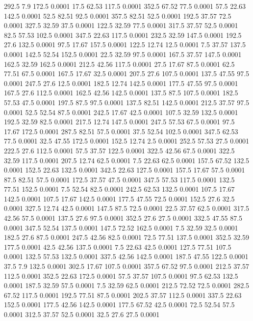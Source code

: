 292.5	7.9	172.5	0.0001
17.5	62.53	117.5	0.0001
352.5	67.52	77.5	0.0001
57.5	22.63	142.5	0.0001
52.5	82.51	92.5	0.0001
357.5	82.51	52.5	0.0001
192.5	37.57	72.5	0.0001
327.5	32.59	37.5	0.0001
122.5	32.59	77.5	0.0001
317.5	37.57	52.5	0.0001
82.5	57.53	102.5	0.0001
347.5	22.63	117.5	0.0001
232.5	32.59	147.5	0.0001
192.5	27.6	132.5	0.0001
97.5	17.67	157.5	0.0001
122.5	12.74	12.5	0.0001
7.5	37.57	137.5	0.0001
142.5	52.54	152.5	0.0001
22.5	32.59	97.5	0.0001
167.5	37.57	147.5	0.0001
162.5	32.59	162.5	0.0001
212.5	42.56	117.5	0.0001
27.5	17.67	87.5	0.0001
62.5	77.51	67.5	0.0001
167.5	17.67	32.5	0.0001
207.5	27.6	107.5	0.0001
137.5	47.55	97.5	0.0001
247.5	27.6	12.5	0.0001
182.5	12.74	142.5	0.0001
177.5	47.55	97.5	0.0001
167.5	27.6	112.5	0.0001
162.5	42.56	142.5	0.0001
137.5	87.5	107.5	0.0001
182.5	57.53	47.5	0.0001
197.5	87.5	97.5	0.0001
137.5	82.51	142.5	0.0001
212.5	37.57	97.5	0.0001
52.5	52.54	87.5	0.0001
242.5	17.67	42.5	0.0001
107.5	32.59	132.5	0.0001
192.5	32.59	82.5	0.0001
217.5	12.74	147.5	0.0001
247.5	57.53	67.5	0.0001
97.5	17.67	172.5	0.0001
287.5	82.51	57.5	0.0001
37.5	52.54	102.5	0.0001
347.5	62.53	77.5	0.0001
32.5	47.55	172.5	0.0001
152.5	12.74	2.5	0.0001
252.5	57.53	27.5	0.0001
222.5	27.6	112.5	0.0001
57.5	37.57	122.5	0.0001
322.5	42.56	67.5	0.0001
322.5	32.59	117.5	0.0001
207.5	12.74	62.5	0.0001
7.5	22.63	62.5	0.0001
157.5	67.52	132.5	0.0001
152.5	22.63	132.5	0.0001
342.5	22.63	127.5	0.0001
157.5	17.67	57.5	0.0001
87.5	82.51	57.5	0.0001
172.5	37.57	47.5	0.0001
347.5	57.53	117.5	0.0001
132.5	77.51	152.5	0.0001
7.5	52.54	82.5	0.0001
242.5	62.53	132.5	0.0001
107.5	17.67	142.5	0.0001
107.5	17.67	142.5	0.0001
177.5	47.55	72.5	0.0001
152.5	27.6	32.5	0.0001
327.5	12.74	42.5	0.0001
147.5	87.5	72.5	0.0001
22.5	37.57	62.5	0.0001
317.5	42.56	57.5	0.0001
137.5	27.6	97.5	0.0001
352.5	27.6	27.5	0.0001
332.5	47.55	87.5	0.0001
347.5	52.54	137.5	0.0001
147.5	72.52	162.5	0.0001
7.5	32.59	32.5	0.0001
182.5	27.6	87.5	0.0001
247.5	42.56	82.5	0.0001
72.5	77.51	137.5	0.0001
352.5	32.59	177.5	0.0001
42.5	42.56	137.5	0.0001
7.5	22.63	42.5	0.0001
127.5	77.51	107.5	0.0001
132.5	57.53	132.5	0.0001
337.5	42.56	142.5	0.0001
187.5	47.55	122.5	0.0001
37.5	7.9	132.5	0.0001
302.5	17.67	107.5	0.0001
357.5	67.52	97.5	0.0001
212.5	37.57	112.5	0.0001
352.5	22.63	172.5	0.0001
57.5	37.57	107.5	0.0001
97.5	62.53	132.5	0.0001
187.5	32.59	57.5	0.0001
7.5	32.59	62.5	0.0001
212.5	72.52	72.5	0.0001
282.5	67.52	117.5	0.0001
192.5	77.51	87.5	0.0001
202.5	37.57	112.5	0.0001
337.5	22.63	152.5	0.0001
177.5	42.56	142.5	0.0001
177.5	67.52	42.5	0.0001
72.5	52.54	57.5	0.0001
312.5	37.57	52.5	0.0001
32.5	27.6	27.5	0.0001
